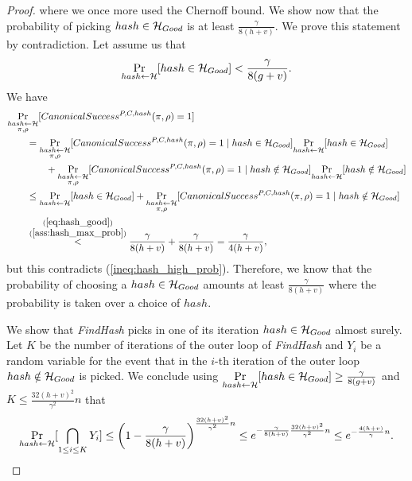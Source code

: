 \begin{proof}
where we once more used the Chernoff bound.
We show now that the probability of picking $hash \in \mathcal{H}_{Good}$ is at least $\frac{\gamma}{8(h+v)}$.
We prove this statement by contradiction. Let assume us that
\begin{align}
  \label{ass:hash_max_prob}
\underset{hash \leftarrow \mathcal{H}}{\Pr}[hash \in \mathcal{H}_{Good}] < \frac{\gamma}{8(g+v)}.
\end{align}
We have
\begin{align*}
  &\underset{\substack{hash \leftarrow \mathcal{H} \\ \pi, \rho}}{\Pr}[CanonicalSuccess^{P,C,hash}(\pi, \rho) = 1] \\
  &\mbox\qquad = \underset{\substack{ hash \leftarrow \mathcal{H} \\ \pi, \rho}}{\Pr}[CanonicalSuccess^{P,C,hash}(\pi, \rho) = 1 \mid hash \in \mathcal{H}_{Good}]
  \underset{hash \leftarrow \mathcal{H}}{\Pr}[hash \in \mathcal{H}_{Good}] \\
  & \mbox\qquad\qquad + \underset{\substack{hash \leftarrow \mathcal{H} \\ \pi, \rho}}{\Pr}[CanonicalSuccess^{P,C,hash}(\pi, \rho) = 1 \mid hash \notin \mathcal{H}_{Good}]
  \underset{hash \leftarrow \mathcal{H}}{\Pr}[hash \notin \mathcal{H}_{Good}] \\
  & \mbox\qquad \leq \underset{hash \leftarrow \mathcal{H}}{\Pr}[hash \in \mathcal{H}_{Good}] +
  \underset{\substack{hash \leftarrow \mathcal{H} \\ \pi, \rho}}{\Pr}[CanonicalSuccess^{P,C,hash}(\pi, \rho) = 1 \mid hash \notin \mathcal{H}_{Good}] \\
  & \mbox\qquad  \stackrel{\substack{ (\ref{eq:hash_good}) \\ (\ref{ass:hash_max_prob})}}{<} \frac{\gamma}{8(h+v)} + \frac{\gamma}{8(h+v)} = \frac{\gamma}{4(h+v)},
\end{align*}
but this contradicts (\ref{ineq:hash_high_prob}).
Therefore, we know that the probability of choosing a $hash \in \mathcal{H}_{Good}$ amounts at least $\frac{\gamma}{8(h+v)}$
where the probability is taken over a choice of $hash$.

We show that \textit{FindHash} picks in one of its iteration $hash \in \mathcal{H}_{Good}$ almost surely.
Let $K$ be the number of iterations of the outer loop of \textit{FindHash} and $Y_i$ be a random variable for the event
that in the $i$-th iteration of the outer loop $hash \notin \mathcal{H}_{Good}$ is picked.
We conclude using $\underset{hash \leftarrow \mathcal{H}}{\Pr}[hash \in \mathcal{H}_{Good}] \geq \frac{\gamma}{8(g+v)}$ and $K \leq \frac{32(h+v)^2}{\gamma^2}n$ that
\begin{align*}
  \underset{hash \leftarrow \mathcal{H}}{\Pr}[ \bigcap_{1 \leq i \leq K} Y_i ] \leq \left(1 - \frac{\gamma}{8(h+v)}\right)^{\frac{32(h+v)^2}{\gamma^2}n}
    \leq e^{-\frac{\gamma}{8(h+v)} \frac{32(h+v)^2}{\gamma^2}n}
    \leq e^{-\frac{4(h+v)}{\gamma}n}.
\end{align*}
\end{proof}
